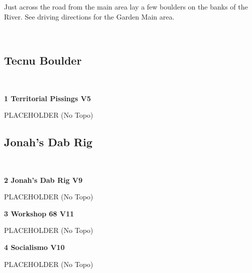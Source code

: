 \begin{multicols*}{2}
\begin{minipage}{\columnwidth}
Just across the road from the main area lay a few boulders on the banks of the River. See driving directions for the Garden Main area.
\end{minipage}

	\begin{minipage}{\columnwidth}
	\
	\end{minipage}
			\subsection*{Tecnu Boulder}\label{bf:Tecnu Boulder}
			\begin{minipage}{\columnwidth}
			\
			\end{minipage}
			
					\label{rt:Territorial Pissings}\colorbox{RoyalBlue!20}{\textbf{1 Territorial Pissings V5  }}
					\begin{adjustwidth}{0.5cm}{}
					\begin{minipage}{\linewidth}					
					PLACEHOLDER
						\newline (No Topo) 
					\end{minipage}
					\end{adjustwidth}
			\subsection*{Jonah's Dab Rig}\label{bf:Jonah's Dab Rig}
			\begin{minipage}{\columnwidth}
			\
			\end{minipage}
			
					\label{rt:Jonah's Dab Rig}\colorbox{Goldenrod!50}{\textbf{2 Jonah's Dab Rig V9  }}
					\begin{adjustwidth}{0.5cm}{}
					\begin{minipage}{\linewidth}					
					PLACEHOLDER
						\newline (No Topo) 
					\end{minipage}
					\end{adjustwidth}
					\label{rt:Workshop 68}\colorbox{red!20}{\textbf{3 Workshop 68 V11  }}
					\begin{adjustwidth}{0.5cm}{}
					\begin{minipage}{\linewidth}					
					PLACEHOLDER
						\newline (No Topo) 
					\end{minipage}
					\end{adjustwidth}
					\label{rt:Socialismo}\colorbox{red!20}{\textbf{4 Socialismo V10  }}
					\begin{adjustwidth}{0.5cm}{}
					\begin{minipage}{\linewidth}					
					PLACEHOLDER
						\newline (No Topo) 
					\end{minipage}
					\end{adjustwidth}

\end{multicols*}
